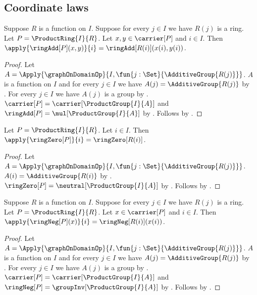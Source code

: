 \subsection{Coordinate laws}

\begin{proposition}\label{product_ring_add_coordinate}
    Suppose $R$ is a function on $I$.
    Suppose for every $j\in I$ we have $R(j)$ is a ring.
    Let $P=\ProductRing{I}{R}$.
    Let $x,y\in\carrier[P]$ and $i\in I$.
    Then
        $\apply{\ringAdd[P](x,y)}{i}
            =\ringAdd[R(i)](x(i),y(i))$.
\end{proposition}
\begin{proof}
    Let $A=\Apply{\graphOnDomainOp}{
        I,\fun{j:\Set}{\AdditiveGroup{R(j)}}}$.
    $A$ is a function on $I$ and for every $j\in I$ we have
        $A(j)=\AdditiveGroup{R(j)}$ by
        .
    For every $j\in I$ we have $A(j)$ is a group by
        .
    $\carrier[P]=\carrier[\ProductGroup{I}{A}]$ and
        $\ringAdd[P]=\mul[\ProductGroup{I}{A}]$ by
        .
    Follows by
        .
\end{proof}

\begin{proposition}\label{product_ring_zero_coordinate}
    Let $P=\ProductRing{I}{R}$.
    Let $i\in I$.
    Then $\apply{\ringZero[P]}{i}=\ringZero[R(i)]$.
\end{proposition}
\begin{proof}
    Let $A=\Apply{\graphOnDomainOp}{
        I,\fun{j:\Set}{\AdditiveGroup{R(j)}}}$.
    $A(i)=\AdditiveGroup{R(i)}$ by
        .
    $\ringZero[P]=\neutral[\ProductGroup{I}{A}]$ by
        .
    Follows by
        .
\end{proof}

\begin{proposition}\label{product_ring_neg_coordinate}
    Suppose $R$ is a function on $I$.
    Suppose for every $j\in I$ we have $R(j)$ is a ring.
    Let $P=\ProductRing{I}{R}$.
    Let $x\in\carrier[P]$ and $i\in I$.
    Then
        $\apply{\ringNeg[P](x)}{i}=\ringNeg[R(i)](x(i))$.
\end{proposition}
\begin{proof}
    Let $A=\Apply{\graphOnDomainOp}{
        I,\fun{j:\Set}{\AdditiveGroup{R(j)}}}$.
    $A$ is a function on $I$ and for every $j\in I$ we have
        $A(j)=\AdditiveGroup{R(j)}$ by
        .
    For every $j\in I$ we have $A(j)$ is a group by
        .
    $\carrier[P]=\carrier[\ProductGroup{I}{A}]$ and
        $\ringNeg[P]=\groupInv[\ProductGroup{I}{A}]$ by
        .
    Follows by
        .
\end{proof}

